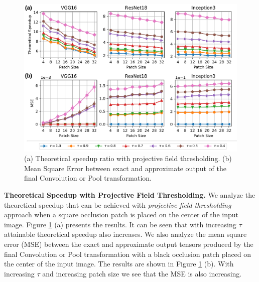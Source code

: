 \begin{figure}[t]
\includegraphics[width=\columnwidth]{images/proj_thresholding}
\caption{(a) Theoretical speedup ratio with projective field thresholding. (b) Mean Square Error between exact and approximate output of the final Convolution or Pool transformation.}
\label{fig:proj_thresholding}
\end{figure}

\vspace{2mm}
\noindent \textbf{Theoretical Speedup with Projective Field Thresholding.}
We analyze the theoretical speedup that can be achieved with \textit{projective field thresholding} approach when a square occlusion patch is placed on the center of the input image.
Figure \ref{fig:proj_thresholding} (a) presents the results.
It can be seen that with increasing $\tau$ attainable theoretical speedup also increases.
We also analyze the mean square error (MSE) between the exact and approximate output tensors produced by the final Convolution or Pool transformation with a black occlusion patch placed on the center of the input image.
The results are shown in Figure \ref{fig:proj_thresholding} (b).
With increasing $\tau$ and increasing patch size we see that the MSE is also increasing.


